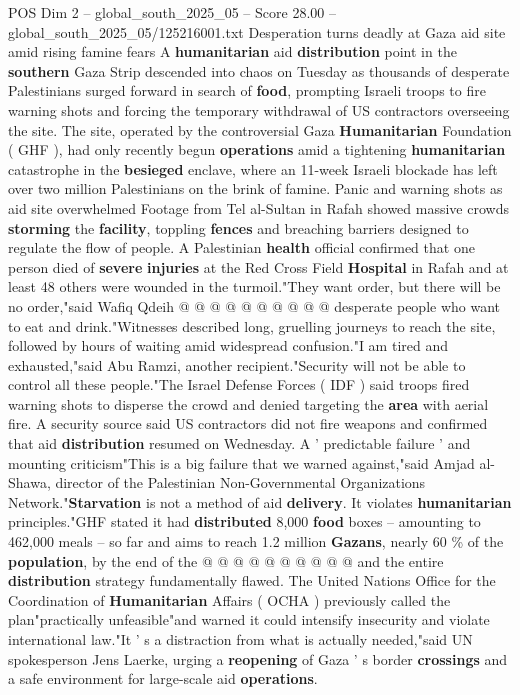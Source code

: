 \begin{textsample}{POS Dim 2 – global\_south\_2025\_05 – Score 28.00 – global\_south\_2025\_05/125216001.txt}  \label{ex:f2_pos_044}
Desperation turns deadly at Gaza aid site amid rising famine fears A \textbf{humanitarian} aid \textbf{distribution} point in the \textbf{southern} Gaza Strip descended into chaos on Tuesday as thousands of desperate Palestinians surged forward in search of \textbf{food}, prompting Israeli troops to fire warning shots and forcing the temporary withdrawal of US contractors overseeing the site.
The site, operated by the controversial Gaza \textbf{Humanitarian} Foundation ( GHF ), had only recently begun \textbf{operations} amid a tightening \textbf{humanitarian} catastrophe in the \textbf{besieged} enclave, where an 11-week Israeli blockade has left over two million Palestinians on the brink of famine.
Panic and warning shots as aid site overwhelmed Footage from Tel al-Sultan in Rafah showed massive crowds \textbf{storming} the \textbf{facility}, toppling \textbf{fences} and breaching barriers designed to regulate the flow of people.
A Palestinian \textbf{health} official confirmed that one person died of \textbf{severe} \textbf{injuries} at the Red Cross Field \textbf{Hospital} in Rafah and at least 48 others were wounded in the turmoil."They want order, but there will be no order,"said Wafiq Qdeih @ @ @ @ @ @ @ @ @ @ desperate people who want to eat and drink."Witnesses described long, gruelling journeys to reach the site, followed by hours of waiting amid widespread confusion."I am tired and exhausted,"said Abu Ramzi, another recipient."Security will not be able to control all these people."The Israel Defense Forces ( IDF ) said troops fired warning shots to disperse the crowd and denied targeting the \textbf{area} with aerial fire.
A security source said US contractors did not fire weapons and confirmed that aid \textbf{distribution} resumed on Wednesday.
A ' predictable failure ' and mounting criticism"This is a big failure that we warned against,"said Amjad al-Shawa, director of the Palestinian Non-Governmental Organizations Network."\textbf{Starvation} is not a method of aid \textbf{delivery}.
It violates \textbf{humanitarian} principles."GHF stated it had \textbf{distributed} 8,000 \textbf{food} boxes -- amounting to 462,000 meals -- so far and aims to reach 1.2 million \textbf{Gazans}, nearly 60 \% of the \textbf{population}, by the end of the @ @ @ @ @ @ @ @ @ @ and the entire \textbf{distribution} strategy fundamentally flawed.
The United Nations Office for the Coordination of \textbf{Humanitarian} Affairs ( OCHA ) previously called the plan"practically unfeasible"and warned it could intensify insecurity and violate international law."It ' s a distraction from what is actually needed,"said UN spokesperson Jens Laerke, urging a \textbf{reopening} of Gaza ' s border \textbf{crossings} and a safe environment for large-scale aid \textbf{operations}.

\end{textsample}
